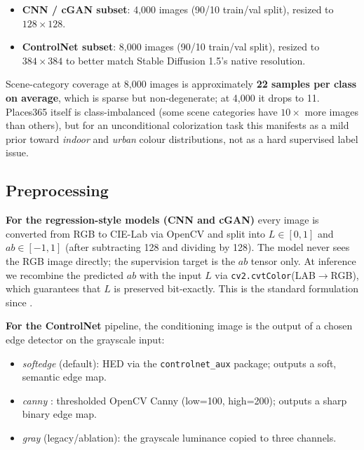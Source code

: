 \documentclass[conference]{IEEEtran}
\begin{document}
\begin{itemize}
  \item \textbf{CNN / cGAN subset}: 4{,}000 images (90/10 train/val
        split), resized to $128\times128$.
  \item \textbf{ControlNet subset}: 8{,}000 images (90/10
        train/val split), resized to $384\times384$ to better match
        Stable Diffusion 1.5's native resolution.
\end{itemize}

Scene-category coverage at 8{,}000 images is approximately
\textbf{22 samples per class on average}, which is sparse but
non-degenerate; at 4{,}000 it drops to 11. Places365 itself is
class-imbalanced (some scene categories have $10\times$ more images
than others), but for an unconditional colorization task this manifests
as a mild prior toward \emph{indoor} and \emph{urban} colour
distributions, not as a hard supervised label issue.

\subsection{Preprocessing}
\textbf{For the regression-style models (CNN and cGAN)} every image is
converted from RGB to CIE-Lab via OpenCV and split into
$L\in[0,1]$ and $ab\in[-1,1]$ (after subtracting 128 and dividing by
128). The model never sees the RGB image directly; the supervision
target is the $ab$ tensor only. At inference we recombine the predicted
$ab$ with the input $L$ via \texttt{cv2.cvtColor}(LAB$\to$RGB), which
guarantees that $L$ is preserved bit-exactly. This is the standard
formulation since \cite{larsson2016learning,zhang2016colorful}.

\textbf{For the ControlNet} pipeline, the conditioning image is the
output of a chosen edge detector on the grayscale input:

\begin{itemize}
  \item \emph{softedge} (default): HED \cite{xie2015holistically} via
        the \texttt{controlnet\_aux} package; outputs a soft, semantic
        edge map.
  \item \emph{canny} \cite{canny1986computational}: thresholded
        OpenCV Canny (low=100, high=200); outputs a sharp binary edge
        map.
  \item \emph{gray} (legacy/ablation): the grayscale luminance copied
        to three channels.
\end{itemize}
\end{document}
